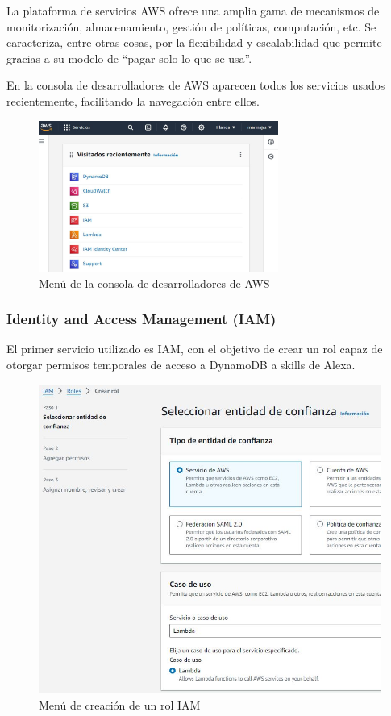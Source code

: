 La plataforma de servicios AWS ofrece una amplia gama de mecanismos de monitorización, almacenamiento, gestión de políticas, computación, etc. Se caracteriza, entre otras cosas, por la flexibilidad y escalabilidad que permite gracias a su modelo de \enquote{pagar solo lo que se usa}.

En la consola de desarrolladores de AWS aparecen todos los servicios usados recientemente, facilitando la navegación entre ellos.

\begin{figure}[H]
	\centering
	\includegraphics[width=0.7\textwidth]{imgs/aws-console-1.jpg}
	\caption{Menú de la consola de desarrolladores de AWS}
	\label{fig:aws-console-1}
\end{figure}


\subsubsection{Identity and Access Management (IAM)}

El primer servicio utilizado es IAM, con el objetivo de crear un rol capaz de otorgar permisos temporales de acceso a DynamoDB a skills de Alexa.

\begin{figure}[H]
	\centering
	\includegraphics[width=1\textwidth]{imgs/aws-iam-2.jpg}
	\caption{Menú de creación de un rol IAM}
	\label{fig:aws-iam-2}
\end{figure}

